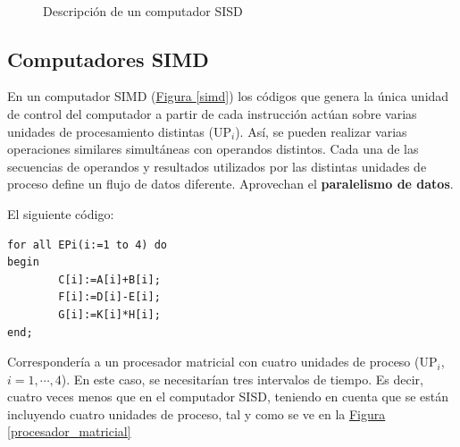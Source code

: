 \documentclass[10pt,a4paper,spanish]{report}
\begin{document}
\begin{figure}[!h]
\centering
\mbox {
\qquad
{}
}
\caption{Descripción de un computador SISD}
\label{sisd}
\end{figure}


\textcolor[rgb]{0.2,0.4,0.8}{\subsection{Computadores SIMD}}
En un computador SIMD (\hyperref[simd]{Figura \ref*{simd}}) los códigos que genera la única unidad de control del computador a partir de cada instrucción actúan sobre varias unidades de procesamiento distintas (UP$_i$). Así, se pueden realizar varias operaciones similares simultáneas con operandos distintos. Cada una de las secuencias de operandos y resultados utilizados por las distintas unidades de proceso define un flujo de datos diferente. Aprovechan el \textbf{\textcolor[rgb]{0.2,0.4,0.8}{paralelismo de datos}}.

El siguiente código:
\begin{verbatim}
for all EPi(i:=1 to 4) do
begin
        C[i]:=A[i]+B[i];
        F[i]:=D[i]-E[i];
        G[i]:=K[i]*H[i];
end;
\end{verbatim}

Correspondería a un procesador matricial con cuatro unidades de proceso (UP$_i$, $i=1,\cdots,4$). En este caso, se necesitarían tres intervalos de tiempo. Es decir, cuatro veces menos que en el computador SISD, teniendo en cuenta que se están incluyendo cuatro unidades de proceso, tal y como se ve en la \hyperref[procesador_matricial]{Figura \ref*{procesador_matricial}}
\end{document}
